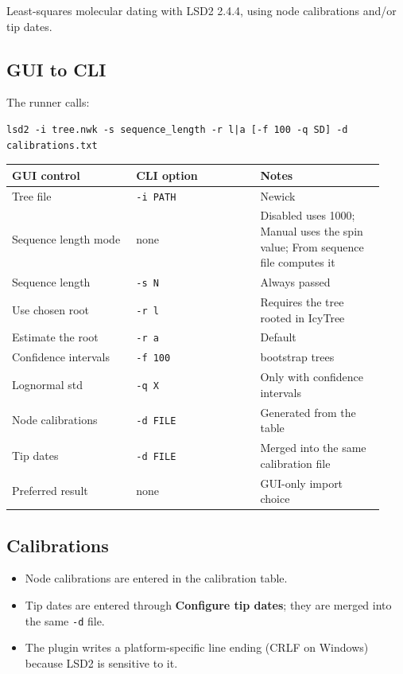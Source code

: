 \documentclass[11pt]{report}
\begin{document}
Least-squares molecular dating with LSD2 2.4.4, using node calibrations and/or tip dates.

\subsection{GUI to CLI}

The runner calls:

\begin{lstlisting}
lsd2 -i tree.nwk -s sequence_length -r l|a [-f 100 -q SD] -d calibrations.txt
\end{lstlisting}

{\footnotesize
\begin{longtable}{@{}>{\raggedright\arraybackslash}p{0.31\linewidth}>{\raggedright\arraybackslash}p{0.31\linewidth}>{\raggedright\arraybackslash}p{0.31\linewidth}@{}}
\toprule
GUI control & CLI option & Notes \\
\midrule
\endhead
Tree file & \texttt{-i PATH} & Newick \\
Sequence length mode & none & Disabled uses 1000; Manual uses the spin value; From sequence file computes it \\
Sequence length & \texttt{-s N} & Always passed \\
Use chosen root & \texttt{-r l} & Requires the tree rooted in IcyTree \\
Estimate the root & \texttt{-r a} & Default \\
Confidence intervals & \texttt{-f 100} & 100 bootstrap trees \\
Lognormal std & \texttt{-q X} & Only with confidence intervals \\
Node calibrations & \texttt{-d FILE} & Generated from the table \\
Tip dates & \texttt{-d FILE} & Merged into the same calibration file \\
Preferred result & none & GUI-only import choice \\
\bottomrule
\end{longtable}
}

\subsection{Calibrations}

\begin{itemize}
  \item Node calibrations are entered in the calibration table.
  \item Tip dates are entered through \textbf{Configure tip dates}; they are merged into the same \texttt{-d} file.
  \item The plugin writes a platform-specific line ending (CRLF on Windows) because LSD2 is sensitive to it.
\end{itemize}
\end{document}
